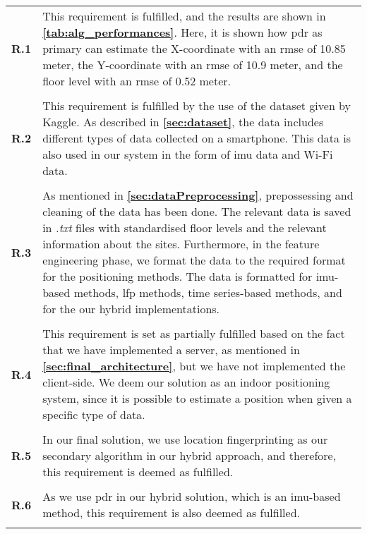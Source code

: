 \begin{longtable}{p{} p{}}

\textbf{R.1} & This requirement is fulfilled, and the results are shown in \textbf{\autoref{tab:alg_performances}}. Here, it is shown how \gls{pdr} as primary can estimate the X-coordinate with an \gls{rmse} of 10.85 meter, the Y-coordinate with an \gls{rmse} of 10.9 meter, and the floor level with an \gls{rmse} of 0.52 meter.
\\\\

\textbf{R.2} & This requirement is fulfilled by the use of the dataset given by Kaggle. As described in \textbf{\autoref{sec:dataset}}, the data includes different types of data collected on a smartphone. This data is also used in our system in the form of \gls{imu} data and Wi-Fi data.
\\\\

\textbf{R.3} & As mentioned in \textbf{\autoref{sec:dataPreprocessing}}, prepossessing and cleaning of the data has been done. The relevant data is saved in \textit{.txt} files with standardised floor levels and the relevant information about the sites. Furthermore, in the feature engineering phase, we format the data to the required format for the positioning methods. The data is formatted for \gls{imu}-based methods, \gls{lfp} methods, time series-based methods, and for the our hybrid implementations.
\\\\

\textbf{R.4} & This requirement is set as partially fulfilled based on the fact that we have implemented a server, as mentioned in \textbf{\autoref{sec:final_architecture}}, but we have not implemented the client-side. We deem our solution as an indoor positioning system, since it is possible to estimate a position when given a specific type of data. 
\\\\

\textbf{R.5} & In our final solution, we use location fingerprinting as our secondary algorithm in our hybrid approach, and therefore, this requirement is deemed as fulfilled.
\\\\

\textbf{R.6} & As we use \gls{pdr} in our hybrid solution, which is an \gls{imu}-based method, this requirement is also deemed as fulfilled.
\\\\


\end{longtable}
